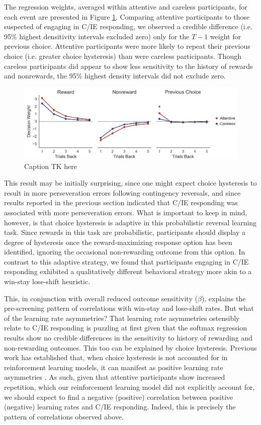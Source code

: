 \documentclass[a4paper,notitlepage,12pt]{article}
\begin{document}
The regression weights, averaged within attentive and careless participants, for each event are presented in Figure \ref{fig:regression}. Comparing attentive participants to those suspected of engaging in C/IE responding, we observed a credible difference (i.e. 95\% highest densitivity intervals excluded zero) only for the $T-1$ weight for previous choice. Attentive participants were more likely to repeat their previous choice (i.e. greater choice hysteresis) than were careless participants. Though careless participants did appear to show less sensitivity to the history of rewards and nonrewards, the 95\% highest density intervals did not exclude zero.

\begin{figure}[!b]
\includegraphics[width=16cm]{../figures/main_03c.png}
\centering
\caption{Caption TK here}
\label{fig:regression}
\end{figure}

This result may be initially surprising, since one might expect choice hysteresis to result in more perseveration errors following contingency reversals, and since results reported in the previous section indicated that C/IE responding was associated with more perseveration errors. What is important to keep in mind, however, is that choice hysteresis is adaptive in this probabilistic reversal learning task. Since rewards in this task are probabilistic, participants should display a degree of hysteresis once the reward-maximizing response option has been identified, ignoring the occasional non-rewarding outcome from this option. In contrast to this adaptive strategy, we found that participants engaging in C/IE responding exhibited a qualitatively different behavioral strategy more akin to a win-stay lose-shift heuristic.

This, in conjunction with overall reduced outcome sensitivity ($\beta$), explains the pre-screening pattern of correlations with win-stay and lose-shift rates. But what of the learning rate asymmetries? That learning rate asymmetries ostensibly relate to C/IE responding is puzzling at first given that the softmax regression results show no credible differences in the sensitivity to history of rewarding and non-rewarding outcomes. This too can be explained by choice hysteresis. Previous work has established that, when choice hysteresis is not accounted for in reinforcement learning models, it can manifest as positive learning rate asymmetries \cite{Katahira2018-ke}. As such, given that attentive participants show increased repetition, which our reinforcement learning model did not explicitly account for, we should expect to find a negative (positive) correlation between positive (negative) learning rates and C/IE responding. Indeed, this is precisely the pattern of correlations observed above.
\end{document}
